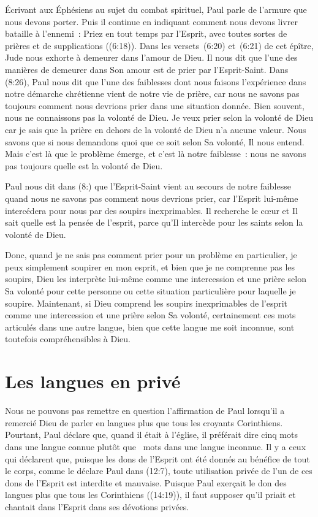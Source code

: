 Écrivant aux Éphésiens au sujet du combat spirituel, Paul parle de l'armure
 que nous devons porter. Puis il continue en indiquant comment
 nous devons livrer bataille à l'ennemi~:
 \og Priez en tout temps par l'Esprit, avec toutes sortes de prières
 et de supplications \fg{} ((6:18)).
 Dans les versets~(6:20) et~(6:21) de cet épître,
 Jude nous exhorte à demeurer dans l'amour de Dieu.
 Il nous dit que l'une des manières de demeurer dans Son amour est de prier
 par l'Esprit-Saint. Dans (8:26), Paul nous dit que l'une
 des faiblesses dont nous faisons l'expérience dans notre démarche
 chrétienne vient de notre vie de prière, car nous ne savons pas toujours
 comment nous devrions prier dans une situation donnée.
 Bien souvent, nous ne connaissons pas la volonté de Dieu.
 Je veux prier selon la volonté de Dieu car je sais que la prière en dehors
 de la volonté de Dieu n'a aucune valeur. Nous savons que si nous demandons
 quoi que ce soit selon Sa volonté, Il nous entend.
 Mais c'est là que le problème émerge, et c'est là notre faiblesse~:
 nous ne savons pas toujours quelle est la volonté de Dieu.

Paul nous dit dans (8:) que l'Esprit-Saint vient au secours
 de notre faiblesse quand nous ne savons pas comment nous devrions prier,
 car l'Esprit lui-même intercédera pour nous par des soupirs inexprimables.
 Il recherche le cœur et Il sait quelle est la pensée de l'esprit,
 parce qu'Il intercède pour les saints selon la volonté de Dieu.

Donc, quand je ne sais pas comment prier pour un problème en particulier,
 je peux simplement soupirer en mon esprit, et bien que je ne comprenne pas
 les soupirs, Dieu les interprète lui-même comme une intercession
 et une prière selon Sa volonté pour cette personne ou cette situation
 particulière pour laquelle je soupire. Maintenant, si Dieu comprend
 les soupirs inexprimables de l'esprit comme une intercession
 et une prière selon Sa volonté, certainement ces mots articulés
 dans une autre langue, bien que cette langue me soit inconnue,
 sont toutefois compréhensibles à Dieu.


\section{Les langues en priv\'e}

Nous ne pouvons pas remettre en question l'affirmation de Paul lorsqu'il
 a remercié Dieu de parler en langues plus que tous les croyants Corinthiens.
 Pourtant, Paul déclare que, quand il était à l'église, il préférait dire
 cinq mots dans une langue connue plutôt que ~mots
 dans une langue inconnue. Il y a ceux qui déclarent que, puisque les dons
 de l'Esprit ont été donnés au bénéfice de tout le corps, comme le déclare
 Paul dans (12:7), toute utilisation privée
 de l'un de ces dons de l'Esprit est interdite et mauvaise.
 Puisque Paul exerçait le don des langues plus que tous les Corinthiens
 ((14:19)), il faut supposer qu'il priait et chantait
 dans l'Esprit dans ses dévotions privées.

